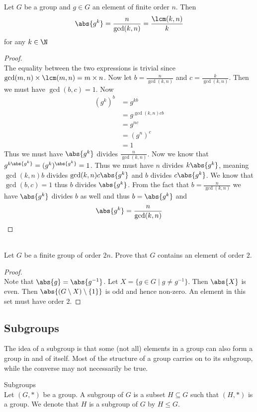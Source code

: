 \documentclass[a4paper]{article}
\begin{document}
\begin{lmm}{}{}\\
Let $G$ be a group and $g\in G$ an element of finite order $n$. Then $$\abs{g^k}=\frac{n}{\gcd(k,n)}=\frac{\lcm(k,n)}{k}$$ for any $k\in\N$
\begin{proof}\\
The equality between the two expressions is trivial since $\gcd(m,n)\times\lcm(m,n)=m\times n$. Now let $b=\frac{n}{\gcd(k,n)}$ and $c=\frac{k}{\gcd(k,n)}$. Then we must have $\gcd(b,c)=1$. Now
\begin{align*}
(g^k)^b&=g^{kb}\\
&=g^{\gcd(k,n)cb}\\
&=g^{nc}\\
&=(g^n)^c\\
&=1
\end{align*}
Thus we must have $\abs{g^k}$ divides $\frac{n}{\gcd(k,n)}$. Now we know that $g^{k\abs{g^k}}=(g^k)^{\abs{g^k}}=1$. Thus we must have $n$ divides $k\abs{g^k}$, meaning $\gcd(k,n)b$ divides $\gcd(k,n)c\abs{g^k}$ and $b$ divides $c\abs{g^k}$. We know that $\gcd(b,c)=1$ thus $b$ divides $\abs{g^k}$. From the fact that $b=\frac{n}{\gcd(k,n)}$ we have $\abs{g^k}$ divides $b$ as well and thus $b=\abs{g^k}$ and $$\abs{g^k}=\frac{n}{\gcd(k,n)}$$
\end{proof}
\end{lmm}

\begin{eg}{}{}\\
Let $G$ be a finite group of order $2n$. Prove that $G$ contains an element of order $2$. 
\begin{proof}\\
Note that $\abs{g}=\abs{g^{-1}}$. Let $X=\{g\in G\;|\;g\neq g^{-1}\}$. Then $\abs{X}$ is even. Then $\abs{(G\setminus X)\setminus\{1\}}$ is odd and hence non-zero. An element in this set must have order $2$. 
\end{proof}
\end{eg}

\subsection{Subgroups}
The idea of a subgroup is that some (not all) elements in a group can also form a group in and of itself. Most of the structure of a group carries on to its subgroup, while the converse may not necessarily be true. 

\begin{defn}{Subgroups}{}\\
Let $(G,\ast)$ be a group. A subgroup of $G$ is a subset $H\subseteq G$ such that $(H,\ast)$ is a group. We denote that $H$ is a subgroup of $G$ by $H\leq G$. 
\end{defn}
\end{document}
